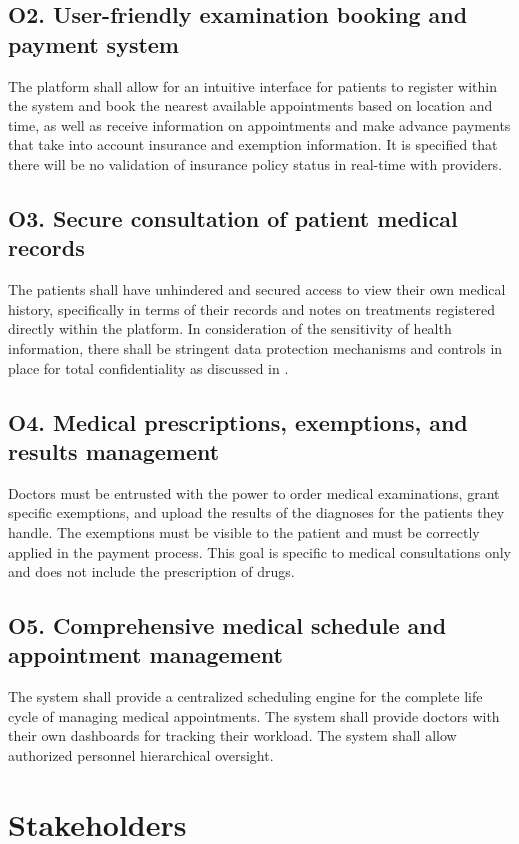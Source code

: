 \documentclass[12pt, a4paper]{article}
\begin{document}
\subsection{O2. User-friendly examination booking and payment system} \label{O2}
The platform shall allow for an intuitive interface for patients to register within the system and book the nearest available appointments based on location and time, as well as receive information on appointments and make advance payments that take into account insurance and exemption information. It is specified that there will be no validation of insurance policy status in real-time with providers.

\subsection{O3. Secure consultation of patient medical records} \label{O3}
The patients shall have unhindered and secured access to view their own medical history, specifically in terms of their records and notes on treatments registered directly within the platform. In consideration of the sensitivity of health information, there shall be stringent data protection mechanisms and controls in place for total confidentiality as discussed in .

\subsection{O4. Medical prescriptions, exemptions, and results management} \label{O4}
Doctors must be entrusted with the power to order medical examinations, grant specific exemptions, and upload the results of the diagnoses for the patients they handle. The exemptions must be visible to the patient and must be correctly applied in the payment process. This goal is specific to medical consultations only and does not include the prescription of drugs.

\subsection{O5. Comprehensive medical schedule and appointment management} \label{O5}
The system shall provide a centralized scheduling engine for the complete life cycle of managing medical appointments. The system shall provide doctors with their own dashboards for tracking their workload. The system shall allow authorized personnel hierarchical oversight. 
\newpage
\section{Stakeholders}
\end{document}
